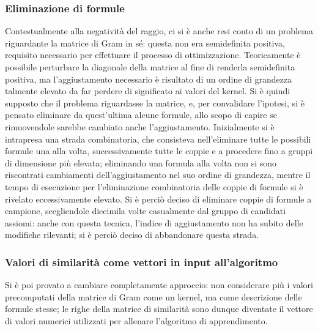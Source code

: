 \documentclass[12pt,a4paper]{report}
\begin{document}
\subsubsection{Eliminazione di formule}
Contestualmente alla negatività del raggio, ci si è anche resi conto di un problema riguardante la matrice di Gram in sé: questa non era semidefinita positiva, requisito necessario per effettuare il processo di ottimizzazione. Teoricamente è possibile perturbare la diagonale della matrice al fine di renderla semidefinita positiva, ma l'aggiustamento necessario è risultato di un ordine di grandezza talmente elevato da far perdere di significato ai valori del kernel. Si è quindi supposto che il problema riguardasse la matrice, e, per convalidare l'ipotesi, si è pensato eliminare da quest'ultima alcune formule, allo scopo di capire se rimuovendole sarebbe cambiato anche l'aggiustamento. Inizialmente si è intrapresa una strada combinatoria, che consisteva nell'eliminare tutte le possibili formule una alla volta, successivamente tutte le coppie e a procedere fino a gruppi di dimensione più elevata; eliminando una formula alla volta non si sono riscontrati cambiamenti dell'aggiustamento nel suo ordine di grandezza, mentre il tempo di esecuzione per l'eliminazione combinatoria delle coppie di formule si è rivelato eccessivamente elevato. Si è perciò deciso di eliminare coppie di formule a campione, scegliendole diecimila volte casualmente dal gruppo di candidati assiomi: anche con questa tecnica, l'indice di aggiustamento non ha subito delle modifiche rilevanti; si è perciò deciso di abbandonare questa strada. 

\subsubsection{Valori di similarità come vettori in input all'algoritmo}
\label{vettoriSection}


Si è poi provato a cambiare completamente approccio: non considerare più i valori precomputati della matrice di Gram come un kernel, ma come descrizione delle formule stesse; le righe della matrice di similarità sono dunque diventate il vettore di valori numerici utilizzati per allenare l'algoritmo di apprendimento.
\end{document}
